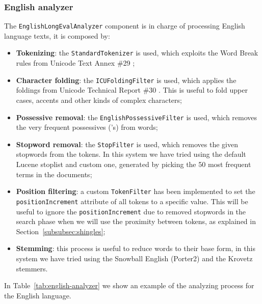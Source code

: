 \subsubsection{English analyzer}

The \texttt{EnglishLongEvalAnalyzer} component is in charge of processing English language texts, it is composed by:
\begin{itemize}
    \item \textbf{Tokenizing}: the \texttt{StandardTokenizer} is used, which exploits the Word Break rules from Unicode Text Annex \#29 \citep{UAX29};
    \item \textbf{Character folding}: the \texttt{ICUFoldingFilter} is used, which applies the foldings from Unicode Technical Report \#30 \citep{UTR30}. This is useful to fold upper cases, accents and other kinds of complex characters;
    \item \textbf{Possessive removal}: the \texttt{EnglishPossessiveFilter} is used, which removes the very frequent possessives ('s) from words;
    \item \textbf{Stopword removal}: the \texttt{StopFilter} is used, which removes the given stopwords from the tokens. In this system we have tried using the default Lucene stoplist and custom one, generated by picking the 50 most frequent terms in the documents;
    \item \textbf{Position filtering}: a custom \texttt{TokenFilter} has been implemented to set the \texttt{position\-Increment} attribute of all tokens to a specific value. This will be useful to ignore the \texttt{position\-Increment} due to removed stopwords in the search phase when we will use the proximity between tokens, as explained in Section~\ref{subsubsec:shingles};
    \item \textbf{Stemming}: this process is useful to reduce words to their base form, in this system we have tried using the Snowball English (Porter2) \citep{EnSnowball} and the Krovetz \citep{Krovetz2000} stemmers.
\end{itemize}

In Table~\ref{tab:english-analyzer} we show an example of the analyzing process for the English language.

